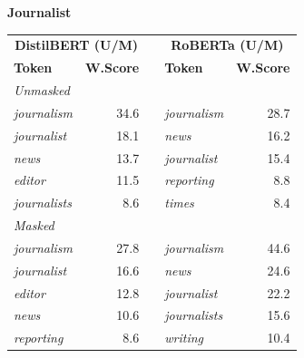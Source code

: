 \documentclass[11pt]{article}
\begin{document}
\vspace{4pt}\noindent\textbf{Journalist}
\begin{center}\scriptsize
\begin{tabular}{lrllr}
\toprule
\multicolumn{2}{c}{\textbf{DistilBERT (U/M)}} & & \multicolumn{2}{c}{\textbf{RoBERTa (U/M)}} \\
\textbf{Token} & \textbf{W.Score} & & \textbf{Token} & \textbf{W.Score} \\
\midrule
\multicolumn{5}{l}{\textit{Unmasked}} \\
\emph{journalism} & 34.6 & & \emph{journalism} & 28.7 \\
\emph{journalist} & 18.1 & & \emph{news} & 16.2 \\
\emph{news} & 13.7 & & \emph{journalist} & 15.4 \\
\emph{editor} & 11.5 & & \emph{reporting} & 8.8 \\
\emph{journalists} & 8.6 & & \emph{times} & 8.4 \\
\multicolumn{5}{l}{\textit{Masked}} \\
\emph{journalism} & 27.8 & & \emph{journalism} & 44.6 \\
\emph{journalist} & 16.6 & & \emph{news} & 24.6 \\
\emph{editor} & 12.8 & & \emph{journalist} & 22.2 \\
\emph{news} & 10.6 & & \emph{journalists} & 15.6 \\
\emph{reporting} & 8.6 & & \emph{writing} & 10.4 \\
\bottomrule
\end{tabular}
\end{center}
\end{document}
